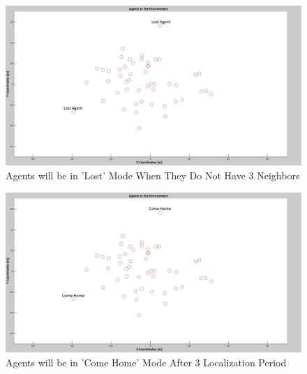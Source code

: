 \begin{figure}[H]
\caption{Agents will be in 'Lost' Mode When They Do Not Have 3 Neighbors} \label{lost_ref}
\centering
\centerline{\includegraphics[scale = 0.25]{Lost-2-2}}
\end{figure} 

\begin{figure}[H]
\captionsetup{format=hang,justification=centerfirst}
\caption{Agents will be in 'Come Home' Mode After 3 Localization Period} \label{lost_ref2} \label{come_home_ref}
\centerline{\includegraphics[scale = 0.25]{Lost-2-3}}
\end{figure} 		
		
